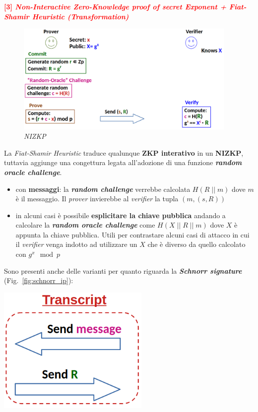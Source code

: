 \begin{flushleft}
    \medskip

    \textcolor{red}{\textbf{[3] \textit{Non-Interactive Zero-Knowledge proof of secret Exponent + Fiat-Shamir Heuristic (Transformation)}}}

    \begin{figure}[h]
        \centering
        \includegraphics[width=0.95\textwidth]{img/fiat_shamir_ip.png}
        \caption{\textit{NIZKP}}
        \label{fig:fiat_shamir_ip}
    \end{figure}

    La \textit{Fiat-Shamir Heuristic} traduce qualunque \textbf{ZKP interativo} in un \textbf{NIZKP}, tuttavia aggiunge una congettura legata all'adozione di una funzione \textbf{\textit{random oracle challenge}}.
    \begin{itemize}[nosep]
        \item con \textbf{messaggi}: la \textbf{\textit{random challenge}} verrebbe calcolata $H(R \; || \; m)$ dove $m$ è il messaggio. Il \textit{prover} invierebbe al \textit{verifier} la tupla $(m, (s, R))$
        \item in alcuni casi è possibile \textbf{esplicitare la chiave pubblica} andando a calcolare la \textbf{\textit{random oracle challenge}} come $H(X \; || \; R \; || \; m)$ dove $X$ è appunta la chiave pubblica. Utili per contrastare alcuni casi di attacco in cui il \textit{verifier} venga indotto ad utilizzare un $X$ che è diverso da quello calcolato con $g^x \mod p$
    \end{itemize}

    Sono presenti anche delle varianti per quanto riguarda la \textbf{\textit{Schnorr signature}} (Fig.~\ref{fig:schnorr_ip}):

    {\centering
        \centering
        \begin{minipage}[t]{0.45\textwidth}
            \centering
            \includegraphics[width=0.55\textwidth]{img/schnorr_message_ip.png}


\end{minipage}}
\end{flushleft}
